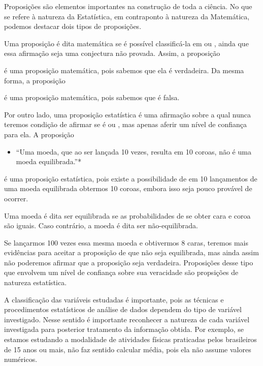 \begin{reflection}
Proposições são elementos importantes na construção de toda a ciência. No que se refere à natureza da Estatística, em contraponto à natureza da Matemática, podemos destacar dois tipos de proposições.

Uma proposição é dita matemática se é possível classificá-la em  ou , ainda que essa afirmação seja uma conjectura não provada. Assim, a proposição


é uma proposição matemática, pois sabemos que ela é verdadeira. Da mesma forma, a proposição


é uma proposição matemática, pois sabemos que é falsa.

Por outro lado, uma proposição estatística é uma afirmação sobre a qual nunca teremos condição de afirmar se é  ou , mas apenas aferir um nível de confiança para ela. A proposição
\begin{itemize}
\item {} 
``Uma moeda, que ao ser lançada 10 vezes, resulta em 10 coroas, não é uma moeda equilibrada.''*

\end{itemize}

é uma proposição estatística, pois existe a possibilidade de em 10 lançamentos de uma moeda equilibrada obtermos 10 coroas, embora isso seja pouco provável de ocorrer.

 Uma moeda é dita ser equilibrada se as probabilidades de se obter cara e coroa são iguais. Caso contrário, a moeda é dita ser não-equilibrada.

Se lançarmos 100 vezes essa mesma moeda e obtivermos 8 caras, teremos mais evidências para aceitar a proposição de que não seja equilibrada, mas ainda assim não poderemos afirmar que a proposição seja verdadeira. Proposições desse tipo que envolvem um nível de confiança sobre sua veracidade são propsições de natureza estatística.
\end{reflection}
\label{\detokenize{PE103-1:sub-classificacao-de-variaveis}}

A classificação das variáveis estudadas é importante, pois as técnicas e procedimentos estatísticos de análise de dados dependem do tipo de variável investigado. Nesse sentido é importante reconhecer a natureza de cada variável investigada para posterior tratamento da informação obtida. Por exemplo, se estamos estudando a modalidade de atividades físicas praticadas pelos brasileiros de 15 anos ou mais, não faz sentido calcular média, pois  ela não assume valores numéricos.

